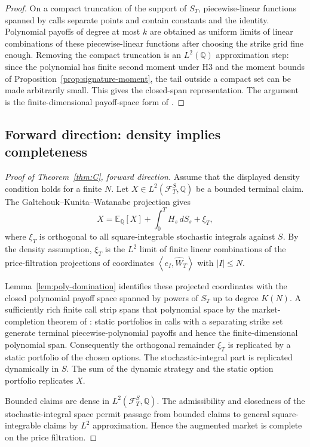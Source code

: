 \documentclass[11pt,oneside]{article}
\theoremstyle{plain}
\theoremstyle{definition}
\theoremstyle{remark}
\newcommand{\E}{\mathbb{E}}
\newcommand{\Q}{\mathbb{Q}}
\newcommand{\cW}{\widehat W}
\newcommand{\FS}{\mathcal F^S}
\newcommand{\inner}[2]{\left\langle #1,#2\right\rangle}
\begin{document}
\begin{proof}
On a compact truncation of the support of $S_T$, piecewise-linear functions spanned by calls separate points and contain constants and the identity. Polynomial payoffs of degree at most $k$ are obtained as uniform limits of linear combinations of these piecewise-linear functions after choosing the strike grid fine enough. Removing the compact truncation is an $L^2(\Q)$ approximation step: since the polynomial has finite second moment under H3 and the moment bounds of Proposition~\ref{prop:signature-moment}, the tail outside a compact set can be made arbitrarily small. This gives the closed-span representation. The argument is the finite-dimensional payoff-space form of \citet{DavisObloj2008}.
\end{proof}

\subsection{Forward direction: density implies completeness}

\begin{proof}[Proof of Theorem~\ref{thm:C}, forward direction]
Assume that the displayed density condition holds for a finite $N$. Let $X\in L^2(\FS_T,\Q)$ be a bounded terminal claim. The Galtchouk--Kunita--Watanabe projection gives
\[
X=\E_\Q[X]+\int_0^T H_s\,dS_s+\xi_T,
\]
where $\xi_T$ is orthogonal to all square-integrable stochastic integrals against $S$. By the density assumption, $\xi_T$ is the $L^2$ limit of finite linear combinations of the price-filtration projections of coordinates $\inner{e_I}{\cW_T}$ with $|I|\leq N$.

Lemma~\ref{lem:poly-domination} identifies these projected coordinates with the closed polynomial payoff space spanned by powers of $S_T$ up to degree $K(N)$. A sufficiently rich finite call strip spans that polynomial space by the market-completion theorem of \citet{DavisObloj2008}: static portfolios in calls with a separating strike set generate terminal piecewise-polynomial payoffs and hence the finite-dimensional polynomial span. Consequently the orthogonal remainder $\xi_T$ is replicated by a static portfolio of the chosen options. The stochastic-integral part is replicated dynamically in $S$. The sum of the dynamic strategy and the static option portfolio replicates $X$.

Bounded claims are dense in $L^2(\FS_T,\Q)$. The admissibility and closedness of the stochastic-integral space permit passage from bounded claims to general square-integrable claims by $L^2$ approximation. Hence the augmented market is complete on the price filtration.
\end{proof}
\end{document}
